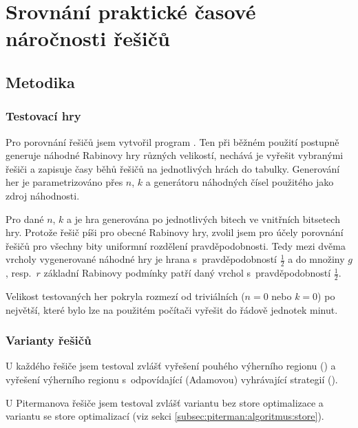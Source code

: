 \chapter{Srovnání praktické časové náročnosti řešičů} \label{chap:comparison}
\section{Metodika} \label{sec:comparison:metodika}
\subsection{Testovací hry}
Pro porovnání řešičů jsem vytvořil program \benchexe. Ten při běžném použití postupně generuje náhodné Rabinovy hry různých velikostí, nechává je vyřešit vybranými řešiči a zapisuje časy běhů řešičů na jednotlivých hrách do tabulky. Generování her je parametrizováno přes $n$, $k$ a  generátoru náhodných čísel  použitého jako zdroj náhodnosti.

Pro dané $n$, $k$ a  je hra generována po jednotlivých bitech ve vnitřních bitsetech hry. Protože řešič píši pro obecné Rabinovy hry, zvolil jsem pro účely porovnání řešičů pro všechny bity uniformní rozdělení pravděpodobnosti. Tedy mezi dvěma vrcholy vygenerované náhodné hry je hrana s~pravděpodobností $\frac{1}{2}$ a do množiny $g$, resp.~$r$ základní Rabinovy podmínky patří daný vrchol s~pravděpodobností $\frac{1}{2}$.

Velikost testovaných her pokryla rozmezí od triviálních ($n = 0$ nebo $k = 0$) po největší, které bylo lze na použitém počítači vyřešit do řádově jednotek minut.
\subsection{Varianty řešičů}
U každého řešiče jsem testoval zvlášť vyřešení pouhého výherního regionu () a vyřešení výherního regionu s~odpovídající (Adamovou) vyhrávající strategií ().

U Pitermanova řešiče jsem testoval zvlášť variantu bez store optimalizace a variantu se store optimalizací (viz sekci \ref{subsec:piterman:algoritmus:store}).
